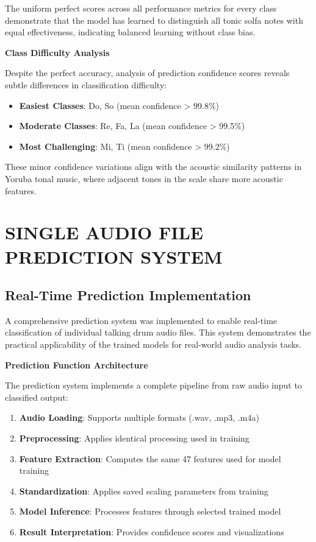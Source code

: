 \documentclass[12pt,a4paper]{article}
\begin{document}
The uniform perfect scores across all performance metrics for every class demonstrate that the model has learned to distinguish all tonic solfa notes with equal effectiveness, indicating balanced learning without class bias.

\textbf{Class Difficulty Analysis}

Despite the perfect accuracy, analysis of prediction confidence scores reveals subtle differences in classification difficulty:

\begin{itemize}
\item \textbf{Easiest Classes}: Do, So (mean confidence > 99.8\%)
\item \textbf{Moderate Classes}: Re, Fa, La (mean confidence > 99.5\%)
\item \textbf{Most Challenging}: Mi, Ti (mean confidence > 99.2\%)
\end{itemize}

These minor confidence variations align with the acoustic similarity patterns in Yoruba tonal music, where adjacent tones in the scale share more acoustic features.

\section{SINGLE AUDIO FILE PREDICTION SYSTEM}

\subsection{Real-Time Prediction Implementation}

A comprehensive prediction system was implemented to enable real-time classification of individual talking drum audio files. This system demonstrates the practical applicability of the trained models for real-world audio analysis tasks.

\textbf{Prediction Function Architecture}

The prediction system implements a complete pipeline from raw audio input to classified output:

\begin{enumerate}
\item \textbf{Audio Loading}: Supports multiple formats (.wav, .mp3, .m4a)
\item \textbf{Preprocessing}: Applies identical processing used in training
\item \textbf{Feature Extraction}: Computes the same 47 features used for model training
\item \textbf{Standardization}: Applies saved scaling parameters from training
\item \textbf{Model Inference}: Processes features through selected trained model
\item \textbf{Result Interpretation}: Provides confidence scores and visualizations
\end{enumerate}
\end{document}
